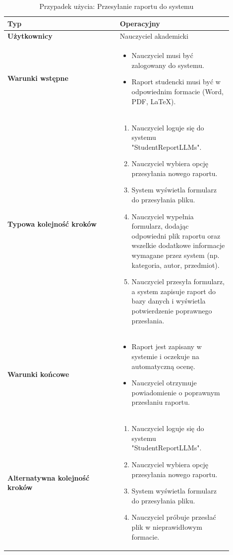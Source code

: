 \documentclass[a4paper, 12pt]{article}
\begin{document}
\begin{table}[H]
\footnotesize
\centering
\caption{Przypadek użycia: Przesyłanie raportu do systemu}
\begin{tabular}{|p{0.45\linewidth}|p{0.45\linewidth}|}
\hline
\textbf{Typ} & Operacyjny \\
\hline
\textbf{Użytkownicy} & Nauczyciel akademicki \\
\hline
\textbf{Warunki wstępne} &
\begin{itemize}
    \item Nauczyciel musi być zalogowany do systemu.
    \item Raport studencki musi być w odpowiednim formacie (Word, PDF, LaTeX).
\end{itemize} \\
\hline
\textbf{Typowa kolejność kroków} &
\begin{enumerate}
    \item Nauczyciel loguje się do systemu "StudentReportLLMs".
    \item Nauczyciel wybiera opcję przesyłania nowego raportu.
    \item System wyświetla formularz do przesyłania pliku.
    \item Nauczyciel wypełnia formularz, dodając odpowiedni plik raportu oraz wszelkie dodatkowe informacje wymagane przez system (np. kategoria, autor, przedmiot).
    \item Nauczyciel przesyła formularz, a system zapisuje raport do bazy danych i wyświetla potwierdzenie poprawnego przesłania.
\end{enumerate} \\
\hline
\textbf{Warunki końcowe} &
\begin{itemize}
    \item Raport jest zapisany w systemie i oczekuje na automatyczną ocenę.
    \item Nauczyciel otrzymuje powiadomienie o poprawnym przesłaniu raportu.
\end{itemize} \\
\hline
\textbf{Alternatywna kolejność kroków} &
\begin{enumerate}
    \item Nauczyciel loguje się do systemu "StudentReportLLMs".
    \item Nauczyciel wybiera opcję przesyłania nowego raportu.
    \item System wyświetla formularz do przesyłania pliku.
    \item Nauczyciel próbuje przesłać plik w nieprawidłowym formacie.

\end{enumerate}
\end{tabular}
\end{table}
\end{document}
